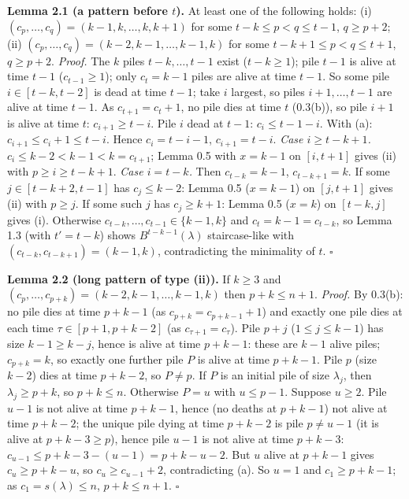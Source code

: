 \textbf{Lemma 2.1 (a pattern before \(t\)).} At least one of the
following holds: (i) \((c_p,\dots,c_q)=(k-1,k,\dots,k,k+1)\) for some
\(t-k\le p<q\le t-1\), \(q\ge p+2\); (ii)
\((c_p,\dots,c_q)=(k-2,k-1,\dots,k-1,k)\) for some
\(t-k+1\le p<q\le t+1\), \(q\ge p+2\). \emph{Proof.} The \(k\) piles
\(t-k,\dots,t-1\) exist (\(t-k\ge1\)); pile \(t-1\) is alive at time
\(t-1\) (\(c_{t-1}\ge1\)); only \(c_t=k-1\) piles are alive at time
\(t-1\). So some pile \(i\in[t-k,t-2]\) is dead at time \(t-1\); take
\(i\) largest, so piles \(i+1,\dots,t-1\) are alive at time \(t-1\). As
\(c_{t+1}=c_t+1\), no pile dies at time \(t\) (0.3(b)), so pile \(i+1\)
is alive at time \(t\): \(c_{i+1}\ge t-i\). Pile \(i\) dead at \(t-1\):
\(c_i\le t-1-i\). With (a): \(c_{i+1}\le c_i+1\le t-i\). Hence
\(c_i=t-i-1\), \(c_{i+1}=t-i\). \emph{Case \(i\ge t-k+1\).}
\(c_i\le k-2<k-1<k=c_{t+1}\); Lemma 0.5 with \(x=k-1\) on \([i,t+1]\)
gives (ii) with \(p\ge i\ge t-k+1\). \emph{Case \(i=t-k\).} Then
\(c_{t-k}=k-1\), \(c_{t-k+1}=k\). If some \(j\in[t-k+2,t-1]\) has
\(c_j\le k-2\): Lemma 0.5 (\(x=k-1\)) on \([j,t+1]\) gives (ii) with
\(p\ge j\). If some such \(j\) has \(c_j\ge k+1\): Lemma 0.5 (\(x=k\))
on \([t-k,j]\) gives (i). Otherwise
\(c_{t-k},\dots,c_{t-1}\in\{k-1,k\}\) and \(c_t=k-1=c_{t-k}\), so Lemma
1.3 (with \(t'=t-k\)) shows \(B^{t-k-1}(\lambda)\) staircase-like with
\((c_{t-k},c_{t-k+1})=(k-1,k)\), contradicting the minimality of \(t\).
\(\square\)

\textbf{Lemma 2.2 (long pattern of type (ii)).} If \(k\ge3\) and
\((c_p,\dots,c_{p+k})=(k-2,k-1,\dots,k-1,k)\) then \(p+k\le n+1\).
\emph{Proof.} By 0.3(b): no pile dies at time \(p+k-1\) (as
\(c_{p+k}=c_{p+k-1}+1\)) and exactly one pile dies at each time
\(\tau\in[p+1,p+k-2]\) (as \(c_{\tau+1}=c_\tau\)). Pile \(p+j\)
(\(1\le j\le k-1\)) has size \(k-1\ge k-j\), hence is alive at time
\(p+k-1\): these are \(k-1\) alive piles; \(c_{p+k}=k\), so exactly one
further pile \(P\) is alive at time \(p+k-1\). Pile \(p\) (size \(k-2\))
dies at time \(p+k-2\), so \(P\ne p\). If \(P\) is an initial pile of
size \(\lambda_j\), then \(\lambda_j\ge p+k\), so \(p+k\le n\).
Otherwise \(P=u\) with \(u\le p-1\). Suppose \(u\ge2\). Pile \(u-1\) is
not alive at time \(p+k-1\), hence (no deaths at \(p+k-1\)) not alive at
time \(p+k-2\); the unique pile dying at time \(p+k-2\) is pile
\(p\neq u-1\) (it is alive at \(p+k-3\ge p\)), hence pile \(u-1\) is not
alive at time \(p+k-3\): \(c_{u-1}\le p+k-3-(u-1)=p+k-u-2\). But \(u\)
alive at \(p+k-1\) gives \(c_u\ge p+k-u\), so \(c_u\ge c_{u-1}+2\),
contradicting (a). So \(u=1\) and \(c_1\ge p+k-1\); as
\(c_1=s(\lambda)\le n\), \(p+k\le n+1\). \(\square\)

